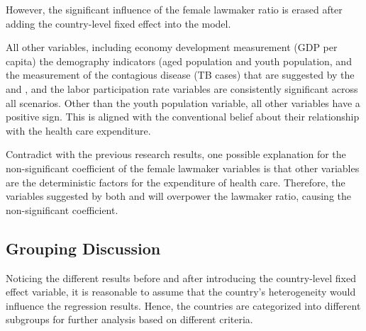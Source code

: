 However, the significant influence of the female lawmaker ratio is erased after adding the country-level fixed effect into the model.

All other variables, including economy development measurement (GDP per capita) the demography indicators (aged population and youth population, and the measurement of the contagious disease (TB cases) that are suggested by the  and , and the labor participation rate variables are consistently significant across all scenarios.
Other than the youth population variable, all other variables have a positive sign.
This is aligned with the conventional belief about their relationship with the health care expenditure.

Contradict with the previous research results, one possible explanation for the non-significant coefficient of the female lawmaker variables is that other variables are the deterministic factors for the expenditure of health care.
Therefore, the variables suggested by both  and  will overpower the lawmaker ratio, causing the non-significant coefficient. 

\subsection{Grouping Discussion}
\label{Grouping}
Noticing the different results before and after introducing the country-level fixed effect variable, it is reasonable to assume that the country's heterogeneity would influence the regression results.
Hence, the countries are categorized into different subgroups for further analysis based on different criteria.
